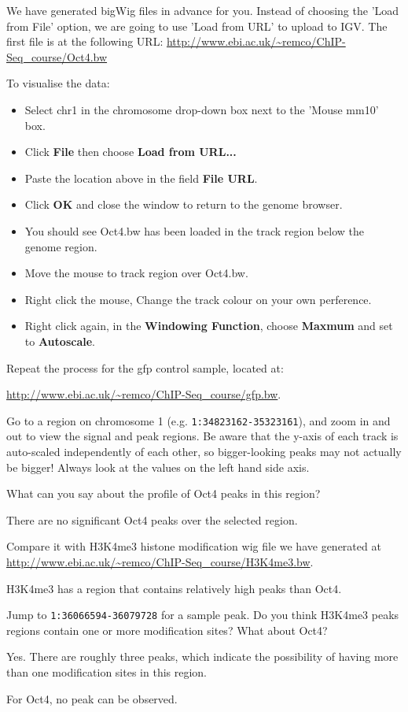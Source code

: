 \begin{steps}
We have generated bigWig files in advance for you. Instead of choosing the 'Load from File' option, we are going to use 'Load from URL' to upload to IGV. The first file is at the following URL:
\url{http://www.ebi.ac.uk/~remco/ChIP-Seq_course/Oct4.bw}

To visualise the data:
\begin{itemize}
	\item Select chr1 in the chromosome drop-down box next to the 'Mouse mm10' box.
	\item Click \textbf{File} then choose \textbf{Load from URL...}
	\item Paste the location above in the field \textbf{File URL}. 
	\item Click \textbf{OK} and close the window to return to the genome browser. 
	\item You should see Oct4.bw has been loaded in the track region below the genome region.
	\item Move the mouse to track region over Oct4.bw.
	\item Right click the mouse, Change the track colour on your own perference.
	\item Right click again, in the \textbf{Windowing Function}, choose \textbf{Maxmum} and set to \textbf{Autoscale}.
\end{itemize}
Repeat the process for the gfp control sample, located at:

\url{http://www.ebi.ac.uk/~remco/ChIP-Seq_course/gfp.bw}.


Go to a region on chromosome 1 (e.g. \texttt{1:34823162-35323161}), and zoom in and out
to view the signal and peak regions. Be aware that the y-axis of each track is auto-scaled independently of each other,
so bigger-looking peaks may not actually be bigger! Always look at the values
on the left hand side axis.
\end{steps}

\begin{questions}
What can you say about the profile of Oct4 peaks in this region? 
\begin{answer}
There are no significant Oct4 peaks over the selected region.
\end{answer}

Compare it with H3K4me3 histone modification wig file we have generated at 
\url{http://www.ebi.ac.uk/~remco/ChIP-Seq_course/H3K4me3.bw}. 
\begin{answer}
H3K4me3 has a region that contains relatively high peaks than Oct4. 
\end{answer}

Jump to \texttt{1:36066594-36079728} for a sample peak. Do you think H3K4me3
peaks regions contain one or more modification sites? What about Oct4?
\begin{answer}
Yes. There are roughly three peaks, which indicate the possibility of having more than one modification sites in this region. 

For Oct4, no peak can be observed.
\end{answer}

\end{questions}

